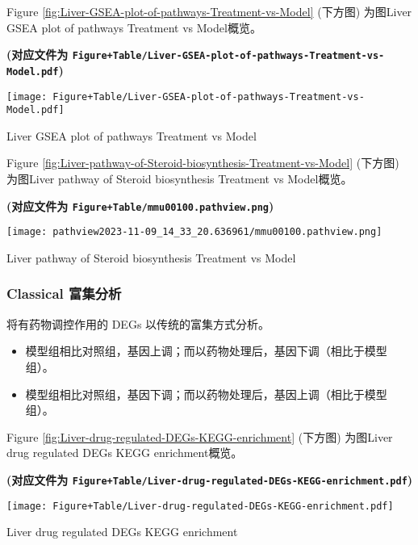 \documentclass[
]{article}
\providecommand{\tightlist}{%
  \setlength{\itemsep}{0pt}\setlength{\parskip}{0pt}}
\begin{document}
Figure \ref{fig:Liver-GSEA-plot-of-pathways-Treatment-vs-Model} (下方图) 为图Liver GSEA plot of pathways Treatment vs Model概览。

\textbf{(对应文件为 \texttt{Figure+Table/Liver-GSEA-plot-of-pathways-Treatment-vs-Model.pdf})}

\def\@captype{figure}
\begin{center}
\texttt{[image: Figure+Table/Liver-GSEA-plot-of-pathways-Treatment-vs-Model.pdf]}
\caption{Liver GSEA plot of pathways Treatment vs Model}\label{fig:Liver-GSEA-plot-of-pathways-Treatment-vs-Model}
\end{center}

Figure \ref{fig:Liver-pathway-of-Steroid-biosynthesis-Treatment-vs-Model} (下方图) 为图Liver pathway of Steroid biosynthesis Treatment vs Model概览。

\textbf{(对应文件为 \texttt{Figure+Table/mmu00100.pathview.png})}

\def\@captype{figure}
\begin{center}
\texttt{[image: pathview2023-11-09\_14\_33\_20.636961/mmu00100.pathview.png]}
\caption{Liver pathway of Steroid biosynthesis Treatment vs Model}\label{fig:Liver-pathway-of-Steroid-biosynthesis-Treatment-vs-Model}
\end{center}

\hypertarget{classical}{%
\subsubsection{Classical 富集分析}\label{classical}}

将有药物调控作用的 DEGs 以传统的富集方式分析。

\begin{itemize}
\tightlist
\item
  模型组相比对照组，基因上调；而以药物处理后，基因下调（相比于模型组）。
\item
  模型组相比对照组，基因下调；而以药物处理后，基因上调（相比于模型组）。
\end{itemize}

Figure \ref{fig:Liver-drug-regulated-DEGs-KEGG-enrichment} (下方图) 为图Liver drug regulated DEGs KEGG enrichment概览。

\textbf{(对应文件为 \texttt{Figure+Table/Liver-drug-regulated-DEGs-KEGG-enrichment.pdf})}

\def\@captype{figure}
\begin{center}
\texttt{[image: Figure+Table/Liver-drug-regulated-DEGs-KEGG-enrichment.pdf]}
\caption{Liver drug regulated DEGs KEGG enrichment}\label{fig:Liver-drug-regulated-DEGs-KEGG-enrichment}
\end{center}
\end{document}
